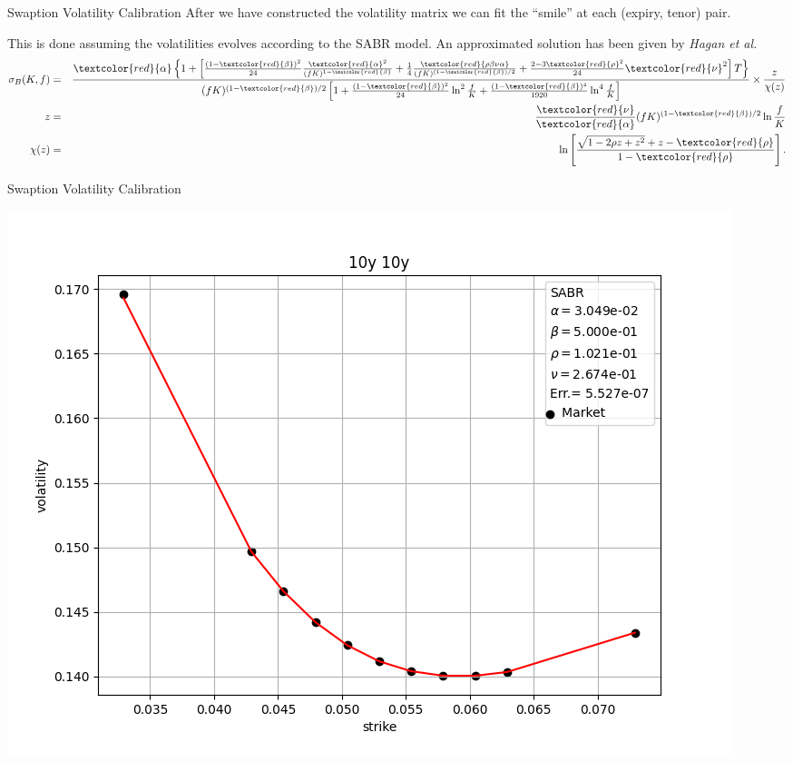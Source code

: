 \documentclass{beamer}
\begin{document}
\begin{frame}{Swaption Volatility Calibration}
  After we have constructed the volatility matrix we can fit the ``smile'' at each (expiry, tenor) pair.

  This is done assuming the volatilities evolves according to the SABR model. An approximated solution has been given by \emph{Hagan et al.}
  \begin{eqnarray} \sigma _{B}(K,f) &=&\frac{\textcolor{red}{\alpha} \left\{ 1+\left[ \frac{\left( 1-\textcolor{red}{\beta} \right) ^{2}}{24}\frac{\textcolor{red}{\alpha} ^{2}}{(fK)^{1-\textcolor{red}{\beta}}}+\frac{1}{4}\frac{\textcolor{red}{\rho \beta \nu\alpha}}{(fK)^{(1-\textcolor{red}{\beta})/2}}+\frac{2-3\textcolor{red}{\rho} ^{2}}{24}\textcolor{red}{\nu}^{2}\right] T\right\} }{(fK)^{(1-\textcolor{red}{\beta})/2}\left[ 1+\frac{(1-\textcolor{red}{\beta})^{2}}{24}\ln ^{2} \frac{f}{K}+\frac{(1-\textcolor{red}{\beta})^{4}}{1920}\ln^{4}\frac{f}{K}\right] } \times \frac{z}{\chi (z)} \notag \\ z &=&\frac{\textcolor{red}{\nu}}{\textcolor{red}{\alpha}}(fK)^{(1-\textcolor{red}{\beta})/2}\ln \frac{f}{K} \notag \\ \chi (z) &=&\ln \left[ \frac{\sqrt{1-2\rho z+z^{2}}+z-\textcolor{red}{\rho}}{1-\textcolor{red}{\rho}}\right] . \notag \end{eqnarray}
\end{frame}

\begin{frame}{Swaption Volatility Calibration}
    \begin{center}
      \includegraphics[width=0.65\linewidth]{10y_10y}
    \end{center}
\end{frame}
\end{document}
